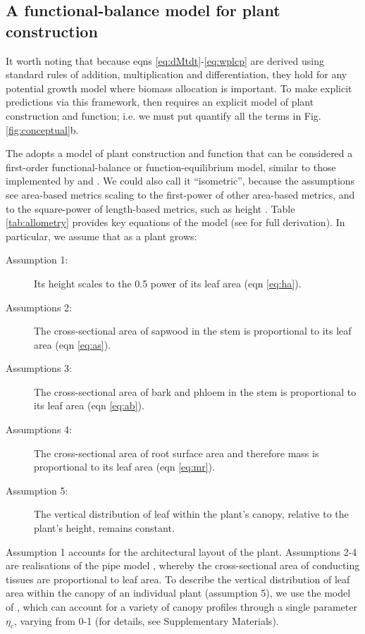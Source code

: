 \documentclass[a4paper,11pt]{article}
\begin{document}
\subsection{A functional-balance model for plant construction}

It worth noting that because eqns \ref{eq:dMtdt}-\ref{eq:wplcp} are derived using standard rules of addition, multiplication and differentiation, they hold for any potential growth model where biomass allocation is important. To make explicit predictions via this framework, then requires an explicit model of plant construction and function; i.e. we must put quantify all the terms in Fig. \ref{fig:conceptual}b.

The {\plant} adopts a model of plant construction and function that can be considered a first-order functional-balance or function-equilibrium model, similar to those implemented by \citet{Makela-1997} and \citet{Moorcroft-2001}. We could also call it ``isometric'', because the assumptions see area-based metrics scaling to the first-power of other area-based metrics, and to the square-power of length-based metrics, such as height \citep{Huxley-1932}. Table \ref{tab:allometry} provides key equations of the model (see \citealt{Falster-2016} for full derivation). In particular, we assume that as a plant grows:
\begin{description}
\item[Assumption 1:] Its height scales to the 0.5 power of its leaf area (eqn \ref{eq:ha}).
\item[Assumptions 2:] The cross-sectional area of sapwood in the stem is proportional to its leaf area (eqn \ref{eq:as}).
\item[Assumptions 3:] The cross-sectional area of bark and phloem in the stem  is proportional to its leaf area (eqn \ref{eq:ab}).
\item[Assumptions 4:] The cross-sectional area of root surface area and therefore mass is proportional to its leaf area (eqn \ref{eq:mr}).
\item[Assumption 5:] The vertical distribution of leaf within the plant's canopy, relative to the plant's height, remains constant.
\end{description}
Assumption 1 accounts for the architectural layout of the plant. Assumptions 2-4 are realisations of the pipe model \citep{Shinozaki-1964}, whereby the cross-sectional area of conducting tissues are proportional to leaf area. To describe the vertical distribution of leaf area within the canopy of an individual plant (assumption 5), we use the model of \citet{Yokozawa-1995}, which can account for a variety of canopy profiles through a single parameter $\eta_c$, varying from 0-1 (for details, see Supplementary Materials).
\end{document}
